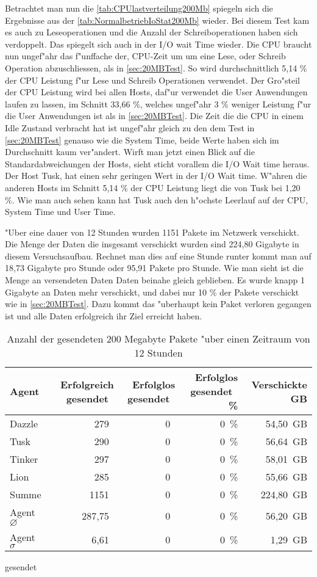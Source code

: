 Betrachtet man nun die \cref{tab:CPUlastverteilung200Mb} spiegeln sich die Ergebnisse aus der \cref{tab:NormalbetriebIoStat200Mb} wieder. %
Bei diesem Test kam es auch zu Leseoperationen und die Anzahl der Schreiboperationen haben sich verdoppelt. %
Das spiegelt sich auch in der I/O wait Time wieder. Die CPU braucht nun ungef"ahr das f"unffache der, CPU-Zeit um %
um eine Lese, oder Schreib Operation abzuschliessen, als in \cref{sec:20MBTest}. %
So wird durchschnittlich 5,14 \% der CPU Leistung f"ur Lese und Schreib Operationen verwendet. Der Gro"steil der CPU Leistung wird %
bei allen Hosts, daf"ur verwendet die User Anwendungen laufen zu lassen, im Schnitt 33,66 \%, welches %
ungef"ahr 3 \% weniger Leistung f"ur die User Anwendungen ist als in \cref{sec:20MBTest}. Die Zeit die die CPU in einem Idle Zustand verbracht %
hat ist ungef"ahr gleich zu den dem Test in \cref{sec:20MBTest} genauso wie die System Time, beide Werte haben sich im Durchschnitt kaum ver"andert. 
Wirft man jetzt einen Blick auf die Standardabweichungen der Hosts, sieht sticht vorallem die I/O Wait time %
heraus. Der Host Tusk, hat einen sehr geringen Wert in der I/O Wait time. W"ahren die anderen Hosts im Schnitt 5,14 \% der CPU Leistung %
liegt die von Tusk bei 1,20 \%. Wie man auch sehen kann hat Tusk auch den h"ochste Leerlauf auf der CPU, System Time und User Time. %

"Uber eine dauer von 12 Stunden wurden 1151 Pakete im Netzwerk verschickt. Die Menge der Daten die insgesamt verschickt wurden sind 224,80 Gigabyte in diesem Versuchsaufbau. %
Rechnet man dies auf eine Stunde runter kommt man auf 18,73 Gigabyte pro Stunde oder 95,91 Pakete pro Stunde. Wie man sieht ist die Menge an versendeten Daten %
Daten beinahe gleich geblieben. Es wurde knapp 1 Gigabyte an Daten mehr verschickt, und dabei nur 10 \% der Pakete verschickt wie in \cref{sec:20MBTest}. 
Dazu kommt das "uberhaupt kein Paket verloren gegangen ist und alle Daten erfolgreich ihr Ziel erreicht haben. 

\begin{table}
\centering
\begin{tabular}{l%
 r<{\,}%
 r<{\,}%
 r<{\,\%}%
 r<{\,GB}%
}
Agent  				& Erfolgreich gesendet			& Erfolglos gesendet			& Erfolglos gesendet	& Verschickte	\\
\hline
Dazzle 				& 279			 		& 0					& 0			& 54,50			\\
Tusk 				& 290					& 0					& 0			& 56,64			\\
Tinker				& 297					& 0					& 0			& 58,01			\\
Lion				& 285					& 0					& 0			& 55,66			\\ 
Summe				& 1151					& 0					& 0 			& 224,80		\\
Agent $\diameter $  		& 287,75				& 0				 	& 0			& 56,20 		\\   
Agent $\sigma $			& 6,61		 			& 0					& 0      		& 1,29		\\
\end{tabular}
gesendet\caption{Anzahl der gesendeten 200 Megabyte Pakete "uber einen Zeitraum von 12 Stunden}
\label{tab:VerschickteDaten200Mb}
\end{table}


